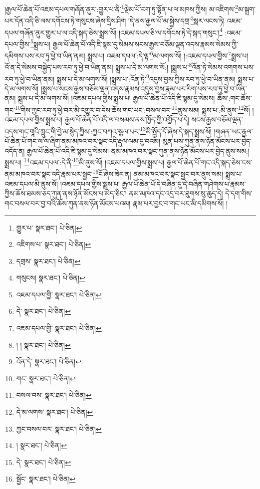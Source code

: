 །རྒྱལ་པོ་ཆེན་པོ་འཇམ་དཔལ་གཞོན་ནུར་:གྱུར་པ་ནི་\footnote{གྱུར་པ་  སྣར་ཐང་།  པེ་ཅིན། }ལྡེམ་པོ་ངག་ཏུ་སྟོན་པ་ལ་མཁས་ཀྱིས། མ་འཇིགས་\footnote{འཇིགས་པ་  སྣར་ཐང་།  པེ་ཅིན། }མ་སྐྲག་པར་དོན་འདི་ཅི་ལས་དགོངས་ཏེ་གསུངས་ཞེས་དྲིས་ཤིག །དེ་ནས་རྒྱལ་པོ་མ་སྐྱེས་དགྲ་\footnote{དགྲས་  སྣར་ཐང་།  པེ་ཅིན། }སླར་ལངས་ཏེ། འཇམ་དཔལ་གཞོན་ནུར་གྱུར་པ་ལ་འདི་སྐད་ཅེས་སྨྲས་སོ། །འཇམ་དཔལ་ཅི་ལ་དགོངས་ཏེ་དེ་སྐད་གསུང་།\footnote{གསུངས།  སྣར་ཐང་།  པེ་ཅིན། } :འཇམ་དཔལ་གྱིས་\footnote{འཇམ་དཔལ་གྱི་  སྣར་ཐང་།  པེ་ཅིན། }སྨྲས་པ། རྒྱལ་པོ་ཆེན་པོ་འདི་ཇི་སྙམ་དུ་སེམས་སངས་རྒྱས་བཅོམ་ལྡན་འདས་རྣམས་སེམས་ཀྱི་དམིགས་པས་རབ་ཏུ་ཕྱེ་བ་ཡིན་ནམ། སྨྲས་པ། འཇམ་དཔལ་:དེ་ལྟ་\footnote{དེ་  སྣར་ཐང་།  པེ་ཅིན། }མ་ལགས་སོ། །:འཇམ་དཔལ་གྱིས་\footnote{འཇམ་དཔལ་གྱི་  སྣར་ཐང་།  པེ་ཅིན། }སྨྲས་པ། འོ་ན་དེ་སེམས་བསྐྱེད་པས་རབ་ཏུ་ཕྱེ་བ་ཡིན་ནམ། སྨྲས་པ་དེ་མ་ལགས་སོ:། །སྨྲས་པ་\footnote{། །  སྣར་ཐང་།  པེ་ཅིན། }འོན་ཏེ་སེམས་འགགས་པས་རབ་ཏུ་ཕྱེ་བ་ཡིན་ནམ། སྨྲས་པ་དེ་མ་ལགས་སོ། །སྨྲས་པ་:འོན་ཏེ་\footnote{འོན་དེ་  སྣར་ཐང་།  པེ་ཅིན། }འདུས་བྱས་ཀྱིས་རབ་ཏུ་ཕྱེ་བ་ཡིན་ནམ། སྨྲས་པ་དེ་མ་ལགས་སོ། །སྨྲས་པ་སངས་རྒྱས་བཅོམ་ལྡན་འདས་རྣམས་འདུས་བྱས་རྣམ་པར་རིག་པས་རབ་ཏུ་ཕྱེ་བ་ཡིན་ནམ། སྨྲས་པ་དེ་མ་ལགས་སོ། །འཇམ་དཔལ་གྱིས་སྨྲས་པ། རྒྱལ་པོ་ཆེན་པོ་འདི་ཇི་སྙམ་དུ་སེམས། ཆོས་:གང་ཆོས་གང་\footnote{གང་  སྣར་ཐང་།  པེ་ཅིན། }གིས་ཀྱང་རབ་ཏུ་ཕྱེ་བར་མི་འགྱུར་བ་དེས་ཆོས་གང་ཡང་:བསལ་བར་\footnote{བསལ་བས་  སྣར་ཐང་།  པེ་ཅིན། }ནུས་སམ། སྨྲས་པ་:མི་ནུས་\footnote{དེ་མ་ལགས་  སྣར་ཐང་།  པེ་ཅིན། }སོ། །འཇམ་དཔལ་གྱིས་སྨྲས་པ། རྒྱལ་པོ་ཆེན་པོ་འདི་ལ་བསམས་ནས་ཁྱོད་ཀྱི་འགྱོད་པ་དེ། སངས་རྒྱས་བཅོམ་ལྡན་འདས་གང་གཱའི་ཀླུང་གི་བྱེ་མ་སྙེད་ཀྱིས་:ཀྱང་བཀའ་སྩལ་པར་\footnote{ཀྱང་བསལ་བར་  སྣར་ཐང་།  པེ་ཅིན། }མི་སྤྱོད་དོ་ཞེས་དེ་སྐད་སྨྲས་སོ། །གཞན་ཡང་རྒྱལ་པོ་ཆེན་པོ་གང་ལ་ལ་ཞིག་ནམ་མཁའ་བར་སྣང་འདི་རྡུལ་ལམ་དུ་བའམ། མུན་པས་ཀུན་ནས་ཉོན་མོངས་པར་བྱེད་འདོད་ན། རྒྱལ་པོ་ཆེན་པོ་འདི་ཇི་སྙམ་དུ་སེམས། ནམ་མཁའ་བར་སྣང་ཀུན་ནས་ཉོན་མོངས་པར་བྱེད་ནུས་སམ:། སྨྲས་པ། \footnote{།    སྣར་ཐང་།  པེ་ཅིན། }འཇམ་དཔལ་:དེ་ནི་\footnote{དེ་  སྣར་ཐང་།  པེ་ཅིན། }མི་ནུས་སོ། །འཇམ་དཔལ་གྱིས་སྨྲས་པ། རྒྱལ་པོ་ཆེན་པོ་གང་འདི་སྐད་ཅེས་ངས་ནམ་མཁའ་བར་སྣང་འདི་རྣམ་པར་སྦྱང་\footnote{སྦྱོང་  སྣར་ཐང་།  པེ་ཅིན། }ངོ་ཞེས་ཟེར་ན། ནམ་མཁའ་བར་སྣང་སྦྱང་བར་ནུས་སམ། སྨྲས་པ་འཇམ་དཔལ་མི་ནུས་སོ། །འཇམ་དཔལ་གྱིས་སྨྲས་པ། རྒྱལ་པོ་ཆེན་པོ་དེ་བཞིན་དུ་དེ་བཞིན་གཤེགས་པ་རྣམས་ཀྱིས་ཆོས་ཐམས་ཅད་ཀུན་ནས་ཉོན་མོངས་པ་མེད་ཅིང་། ནམ་མཁའ་དང་འདྲ་བར་ཐུགས་སུ་ཆུད་དེ། དེ་དག་གིས་གང་བསལ་བར་བྱ་བའི་ཆོས་ཀུན་ནས་ཉོན་མོངས་པའམ། རྣམ་པར་བྱང་བ་གང་ཡང་མི་དམིགས་སོ། །
